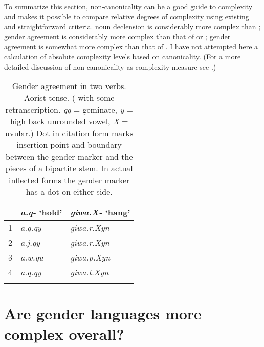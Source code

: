 \documentclass[output=collectionpaper]{langsci/langscibook}
\begin{document}
\largerpage
To summarize this section, non-canonicality can be a good guide to complexity and makes it possible to compare relative degrees of complexity using existing and straightforward criteria.  noun declension is considerably more complex than ;  gender agreement is considerably more complex than that of  or ;  gender agreement is somewhat more complex than that of . I have not attempted here a calculation of absolute complexity levels based on canonicality. (For a more detailed discussion of non-canonicality as complexity measure see \citealt{Nichols2016,NicholsInpress}.)

\clearpage 

\begin{table}[t]
\caption{Gender agreement in two  verbs. Aorist tense. (\citealt[85]{Dobrushina1999} with some retranscription. \textit{qq} = geminate, \textit{y} = high back unrounded vowel, \textit{X} = uvular.) Dot in citation form marks insertion point and boundary between the gender marker and the pieces of a bipartite stem. In actual inflected forms the gender marker has a dot on either side.}
\label{extab:Nich:8}

\begin{tabular}{p{0.5cm}p{4cm}p{5cm}}
\lsptoprule
	 &	{\itshape a.q-} `hold'	 &	{\itshape giwa.X-} `hang' \\
			 \midrule
	1 &	\itshape a.q.qy &			\itshape 	giwa.r.Xyn \\
	2 &	\itshape  a.j.qy &			\itshape 	giwa.r.Xyn \\
	3 &	\itshape a.w.qu &			\itshape 	giwa.p.Xyn \\
	4 &	\itshape a.q.qy	 &			\itshape 	giwa.t.Xyn \\
\lspbottomrule\end{tabular}
\end{table}
\section{Are gender languages more complex overall?}
\label{sec:Nich:3}
\end{document}

